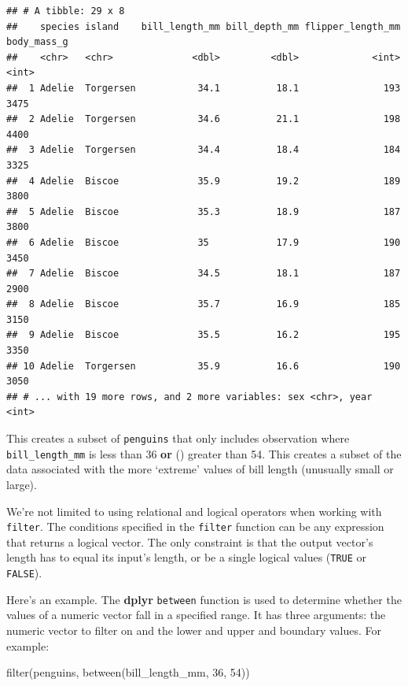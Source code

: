 \documentclass[
]{book}
\newenvironment{Shaded}{\begin{snugshade}}{\end{snugshade}}
\newcommand{\DecValTok}[1]{\textcolor[rgb]{0.00,0.00,0.81}{#1}}
\newcommand{\FunctionTok}[1]{\textcolor[rgb]{0.00,0.00,0.00}{#1}}
\newcommand{\NormalTok}[1]{#1}
\begin{document}
\begin{verbatim}
## # A tibble: 29 x 8
##    species island    bill_length_mm bill_depth_mm flipper_length_mm body_mass_g
##    <chr>   <chr>              <dbl>         <dbl>             <int>       <int>
##  1 Adelie  Torgersen           34.1          18.1               193        3475
##  2 Adelie  Torgersen           34.6          21.1               198        4400
##  3 Adelie  Torgersen           34.4          18.4               184        3325
##  4 Adelie  Biscoe              35.9          19.2               189        3800
##  5 Adelie  Biscoe              35.3          18.9               187        3800
##  6 Adelie  Biscoe              35            17.9               190        3450
##  7 Adelie  Biscoe              34.5          18.1               187        2900
##  8 Adelie  Biscoe              35.7          16.9               185        3150
##  9 Adelie  Biscoe              35.5          16.2               195        3350
## 10 Adelie  Torgersen           35.9          16.6               190        3050
## # ... with 19 more rows, and 2 more variables: sex <chr>, year <int>
\end{verbatim}

This creates a subset of \texttt{penguins} that only includes observation where \texttt{bill\_length\_mm} is less than 36 \textbf{or} (\texttt{\textbar{}}) greater than 54. This creates a subset of the data associated with the more `extreme' values of bill length (unusually small or large).

We're not limited to using relational and logical operators when working with \texttt{filter}. The conditions specified in the \texttt{filter} function can be any expression that returns a logical vector. The only constraint is that the output vector's length has to equal its input's length, or be a single logical values (\texttt{TRUE} or \texttt{FALSE}).

Here's an example. The \textbf{dplyr} \texttt{between} function is used to determine whether the values of a numeric vector fall in a specified range. It has three arguments: the numeric vector to filter on and the lower and upper and boundary values. For example:

\begin{Shaded}
\begin{Highlighting}[]
\FunctionTok{filter}\NormalTok{(penguins, }\FunctionTok{between}\NormalTok{(bill\_length\_mm, }\DecValTok{36}\NormalTok{, }\DecValTok{54}\NormalTok{))}
\end{Highlighting}
\end{Shaded}
\end{document}
